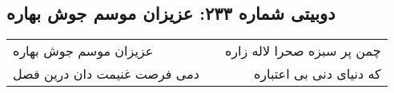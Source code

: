 \begin{center}
\section*{دوبیتی شماره ۲۳۳: عزیزان موسم جوش بهاره}
\label{sec:233}
\begin{longtable}{l p{0.5cm} r}
عزیزان موسم جوش بهاره
&&
چمن پر سبزه صحرا لاله زاره
\\
دمی فرصت غنیمت دان درین فصل
&&
که دنیای دنی بی اعتباره
\\
\end{longtable}
\end{center}
